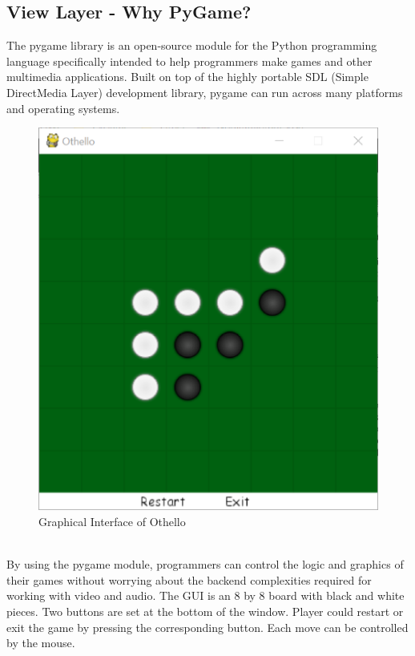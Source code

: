 \documentclass[letterpaper,12pt]{article}
\begin{document}
\subsection{View Layer - Why PyGame?}
The pygame library is an open-source module for the Python programming language specifically intended to help programmers make games and other multimedia applications. Built on top of the highly portable SDL (Simple DirectMedia Layer) development library, pygame can run across many platforms and operating systems.\\
\begin{figure}[!htb]
\centering
\includegraphics[scale=.3]{GUI.eps}
\caption{Graphical Interface of Othello}
\end{figure}\\
\noindent
By using the pygame module, programmers can control the logic and graphics of their games without worrying about the backend complexities required for working with video and audio.
\noindent
The GUI is an 8 by 8 board with black and white pieces. Two buttons are set at the bottom of the window. Player could restart or exit the game by pressing the corresponding button. Each move can be controlled by the mouse.
\end{document}
